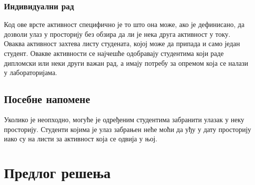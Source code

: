 \documentclass[a4paper, 12pt, diplomski]{etfcyr}
\begin{document}
        \subsection[Сценарио 5]{Индивидуални рад}
            \begin{justify}
                Код ове врсте активност специфично је то што она може, ако је дефинисано, да дозволи улаз у просторију без обзира да ли је нека друга активност у току. Оваква активност захтева листу студената, којој може да припада и само један студент. Овакве активности се најчешће одобравају студентима који раде дипломски или неки други важан рад, а имају потребу за опремом која се налази у лабораторијама.
            \end{justify}
            
        \section{Посебне напомене}
            \begin{justify}
                Уколико је неопходно, могуће је одређеним студентима забранити улазак у неку просторију. Студенти којима је улаз забрањен неће моћи да уђу у дату просторију иако су на листи за активност која се одвија у њој.
            \end{justify}
            
    \chapter{Предлог решења}
    
\end{document}
